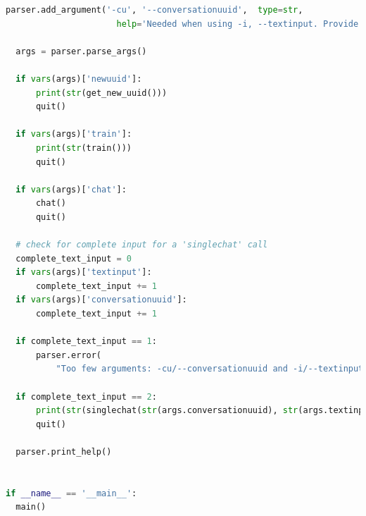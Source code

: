 \documentclass[12pt,oneside,titlepage,listof=totoc,bibliography=totoc]{scrartcl}
\begin{document}
\begin{appendices}
\begin{lstlisting}[language=python]
  parser.add_argument('-cu', '--conversationuuid',  type=str,
                      help='Needed when using -i, --textinput. Provide a UUID to a conversation.')

  args = parser.parse_args()

  if vars(args)['newuuid']:
      print(str(get_new_uuid()))
      quit()

  if vars(args)['train']:
      print(str(train()))
      quit()

  if vars(args)['chat']:
      chat()
      quit()

  # check for complete input for a 'singlechat' call
  complete_text_input = 0
  if vars(args)['textinput']:
      complete_text_input += 1
  if vars(args)['conversationuuid']:
      complete_text_input += 1

  if complete_text_input == 1:
      parser.error(
          "Too few arguments: -cu/--conversationuuid and -i/--textinput are both needed.")

  if complete_text_input == 2:
      print(str(singlechat(str(args.conversationuuid), str(args.textinput))))
      quit()

  parser.print_help()


if __name__ == '__main__':
  main()
\end{lstlisting}



\end{appendices}


\newpage




\end{document}
